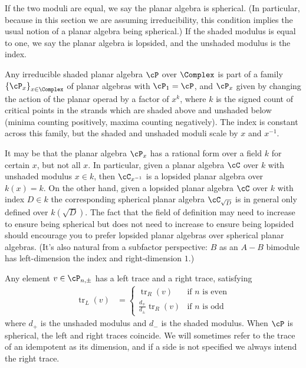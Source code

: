 If the two moduli are equal, we say the planar algebra is spherical. (In particular, because in this section we are assuming irreducibility, this condition implies the usual notion of a planar algebra being spherical.) If the shaded modulus is equal to one, we say the planar algebra is lopsided, and the unshaded modulus is the index.

Any irreducible shaded planar algebra $\cP$ over $\Complex$ is part of a family $\left\{\cP_x\right\}_{x \in \Complex}$ of planar algebras with $\cP_1 = \cP$, and $\cP_x$ given by changing the action of the planar operad by a factor of $x^k$, where $k$ is the signed count of critical points in the strands which are shaded above and unshaded below (minima counting positively, maxima counting negatively). The index is constant across this family, but the shaded and unshaded moduli scale by $x$ and $x^{-1}$. 

It may be that the planar algebra $\cP_x$ has a rational form over a field $k$ for certain $x$, but not all $x$.  In particular, given a planar algebra $\cC$ over $k$ with unshaded modulus $x \in k$, then $\cC_{x^{-1}}$ is a lopsided planar algebra over $k(x)=k$.  On the other hand, given a lopsided planar algebra $\cC$ over $k$ with index $D \in k$ the corresponding spherical planar algebra $\cC_{\sqrt{D}}$ is in general only defined over $k(\sqrt{D})$.  The fact that the field of definition may need to increase to ensure being spherical but does not need to increase to ensure being lopsided should encourage you to prefer lopsided planar algebras over spherical planar algebras. (It's also natural from a subfactor perspective: $B$ as an $A-B$ bimodule has left-dimension the index and right-dimension $1$.)

\newcommand{\trl}[1]{\operatorname{tr}_{L}\left(#1\right)}
\newcommand{\trr}[1]{\operatorname{tr}_{R}\left(#1\right)}

Any element $v \in \cP_{n,\pm}$ has a left trace and a right trace, satisfying
\begin{align*}
\trl{v} & =
	\begin{cases}
		\trr{v} & \text{if $n$ is even} \\
		\frac{d_{\mp}}{d_{\pm}} \trr{v} & \text{if $n$ is odd}
	\end{cases}
\end{align*}
where $d_+$ is the unshaded modulus and $d_-$ is the shaded modulus. When $\cP$ is spherical, the left and right traces coincide. We will sometimes refer to the trace of an idempotent as its dimension, and if a side is not specified we always intend the right trace.

